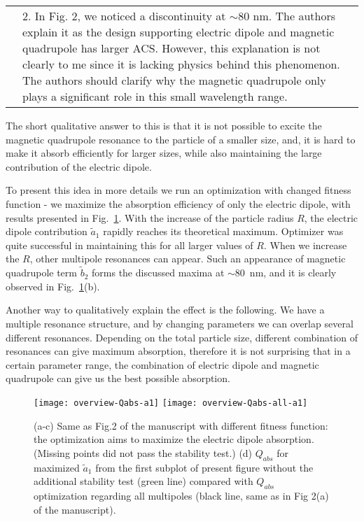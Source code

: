 \documentclass[a4paper]{article}
\begin{document}
\begin{tabular}[!H]{l|p{}}
  \quad & 2.  In Fig. 2, we noticed a discontinuity at $\sim$80
  nm. The authors explain it as the design supporting electric dipole
  and magnetic quadrupole has larger ACS. However, this explanation is
  not clearly to me since it is lacking physics behind this
  phenomenon. The authors should clarify why the magnetic quadrupole
  only plays a significant role in this small wavelength range.
\end{tabular}

The short qualitative answer to this is that it is not possible to
excite the magnetic quadrupole resonance to the particle of a smaller
size, and, it is hard to make it absorb efficiently for larger sizes, while
also maintaining the large contribution of the electric dipole.

To present this idea in more details we run an optimization with
changed fitness function - we maximize the absorption efficiency of
only the electric dipole, with results presented in
Fig.~\ref{fig:a1max}. With the increase of the particle radius $R$, the electric dipole contribution
$\tilde{a}_1$ rapidly reaches its theoretical maximum. Optimizer was
quite successful in maintaining this for all larger values of $R$. When
we increase the $R$, other multipole resonances can appear. Such an
appearance of magnetic quadrupole term $\tilde{b}_2$ forms the discussed maxima at $\sim
80$~nm, and it is clearly observed in Fig.~\ref{fig:a1max}(b).

Another way to qualitatively explain the effect is the following. We
have a multiple resonance structure, and by changing parameters we can
overlap several different resonances. Depending on the total particle
size, different combination of resonances can give maximum absorption,
therefore it is not surprising that in a certain parameter range, the
combination of electric dipole and magnetic quadrupole can give us the
best possible absorption.

\begin{figure}
  \texttt{[image: overview-Qabs-a1]}
   \texttt{[image: overview-Qabs-all-a1]}
  \caption{(a-c) Same as Fig.2 of the manuscript with different
    fitness function: the optimization aims to maximize the electric
    dipole absorption. (Missing points did not pass the stability
    test.) (d) $Q_{abs}$ for maximized $\tilde{a}_1$ from the first
    subplot of present figure without the additional stability test
    (green line) compared with $Q_{abs}$ optimization regarding all
    multipoles (black line, same as in Fig 2(a) of the
    manuscript).\label{fig:a1max}}
\end{figure}
\end{document}
